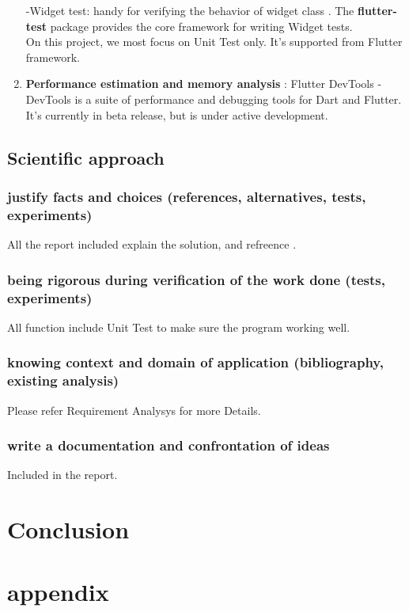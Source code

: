 \documentclass{article}
\begin{document}
\begin{enumerate}
 -Widget test: handy for verifying the behavior of widget class . The \textbf{flutter-test} package provides the core framework for writing Widget tests. \\
On this project, we most focus on Unit Test only. It's supported from Flutter framework.
\item \textbf{Performance estimation and memory analysis} : Flutter DevTools - DevTools is a suite of performance and debugging tools for Dart and Flutter. It’s currently in beta release, but is under active development.
\end{enumerate}

\subsection{Scientific approach } 
\subsubsection{justify facts and choices (references, alternatives, tests, experiments)}
All the report included explain the solution, and refreence .
\subsubsection{being rigorous during verification of the work done (tests, experiments)}
All function include Unit Test to make sure the program working well.
\subsubsection{knowing context and domain of application (bibliography, existing analysis)}
Please refer Requirement Analysys for more Details.
\subsubsection{write a documentation and confrontation of ideas}
Included in the report.

\section{Conclusion }

\section{appendix }
\end{document}
